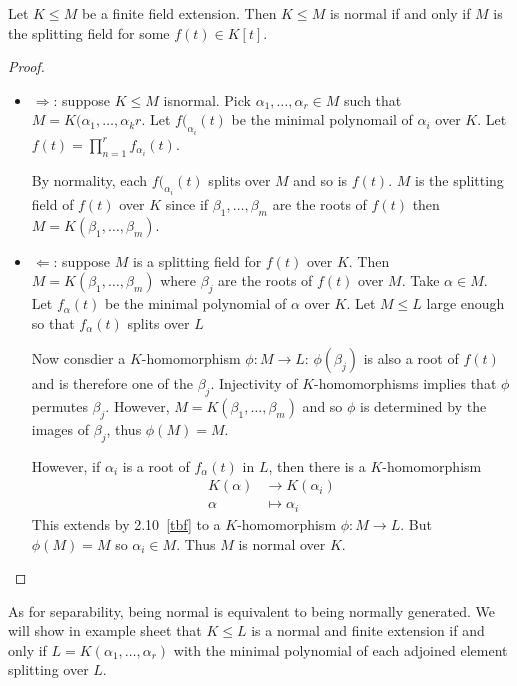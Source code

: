 \documentclass[a4paper]{article}
\begin{document}
\begin{theorem}
  Let \(K \leq M\) be a finite field extension. Then \(K \leq M\) is normal if and only if \(M\) is the splitting field for some \(f(t) \in K[t]\).
\end{theorem}

\begin{proof}\leavevmode
  \begin{itemize}
  \item \(\Rightarrow\): suppose \(K \leq M\) isnormal. Pick \(\alpha_1, \dots, \alpha_r \in M\) such that \(M = K(\alpha_1, \dots, \alpha_kr\). Let \(f(_{\alpha_i}(t)\) be the minimal polynomail of \(\alpha_i\) over \(K\). Let \(f(t) = \prod_{n = 1}^{r} f_{\alpha_i}(t)\).

    By normality, each \(f(_{\alpha_i}(t)\) splits over \(M\) and so is \(f(t)\). \(M\) is the splitting field of \(f(t)\) over \(K\) since if \(\beta_1, \dots, \beta_m\) are the roots of \(f(t)\) then \(M = K(\beta_1, \dots, \beta_m)\).
  \item \(\Leftarrow\): suppose \(M\) is a splitting field for \(f(t)\) over \(K\). Then \(M = K(\beta_1, \dots, \beta_m)\) where \(\beta_j\) are the roots of \(f(t)\) over \(M\). Take \(\alpha \in M\). Let \(f_\alpha(t)\) be the minimal polynomial of \(\alpha\) over \(K\). Let \(M \leq L\) large enough so that \(f_\alpha(t)\) splits over \(L\)

    Now consdier a \(K\)-homomorphism \(\phi: M \to L\): \(\phi(\beta_j)\) is also a root of \(f(t)\) and is therefore one of the \(\beta_j\). Injectivity of \(K\)-homomorphisms implies that \(\phi\) permutes \(\beta_j\). However, \(M = K(\beta_1, \dots, \beta_m)\) and so \(\phi\) is determined by the images of \(\beta_j\), thus \(\phi(M) = M\).

    However, if \(\alpha_i\) is a root of \(f_\alpha(t)\) in \(L\), then there is a \(K\)-homomorphism
    \begin{align*}
      K(\alpha) &\to K(\alpha_i) \\
      \alpha &\mapsto \alpha_i
    \end{align*}
    This extends by 2.10~\ref{tbf} to a \(K\)-homomorphism \(\phi: M \to L\). But \(\phi(M) = M\) so \(\alpha_i \in M\). Thus \(M\) is normal over \(K\).
  \end{itemize}
\end{proof}

\begin{remark}
  As for separability, being normal is equivalent to being normally generated. We will show in example sheet that \(K \leq L\) is a normal and finite extension if and only if \(L = K(\alpha_1, \dots, \alpha_r)\) with the minimal polynomial of each adjoined element splitting over \(L\).
\end{remark}
\end{document}
